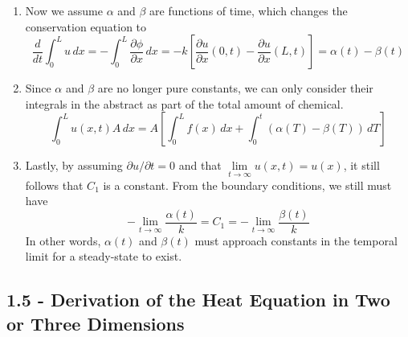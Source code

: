 \documentclass[a4paper]{article}
\begin{document}
\begin{enumerate}[label=(\alph*)]
	\item Now we assume \( \alpha \) and \( \beta \) are functions of time, which changes the conservation equation to
	\[
		\frac{d }{dt}\int^{L}_{0} u \, dx = -\int^{L}_{0} \frac{\partial \phi}{\partial x} \, dx = -k \!\left[ \frac{\partial u}{\partial x}\!\left( 0,t \right) - \frac{\partial u}{\partial x}\!\left( L,t \right) \right] = \alpha \!\left( t \right) - \beta \!\left( t \right)
	\]
	\item Since \( \alpha \) and \( \beta \) are no longer pure constants, we can only consider their integrals in the abstract as part of the total amount of chemical.
	\[
		\int^{L}_{0} u \!\left( x,t \right)A \, dx = A \!\left[ \int^{L}_{0} f \!\left( x \right) \, dx + \int^{t}_{0} \!\left( \alpha \!\left( T \right) - \beta \!\left( T \right) \right) \, dT \right]  
	\]
	\item Lastly, by assuming \( \partial u / \partial t = 0 \) and that \( \lim\limits_{t \to \infty} u \!\left( x,t \right) = u \!\left( x \right) \), it still follows that \( C_{1} \) is a constant. From the boundary conditions, we still must have
	\[
		-\lim\limits_{t \to \infty}\frac{\alpha \!\left( t \right)}{k} = C_{1} = -\lim\limits_{t \to \infty}\frac{\beta \!\left( t \right)}{k} 
	\]
	In other words, \( \alpha \!\left( t \right) \) and \( \beta \!\left( t \right) \) must approach constants in the temporal limit for a steady-state to exist.
\end{enumerate}

\newpage
\subsection{\textsf{1.5 - Derivation of the Heat Equation in Two or Three Dimensions}}
\end{document}

